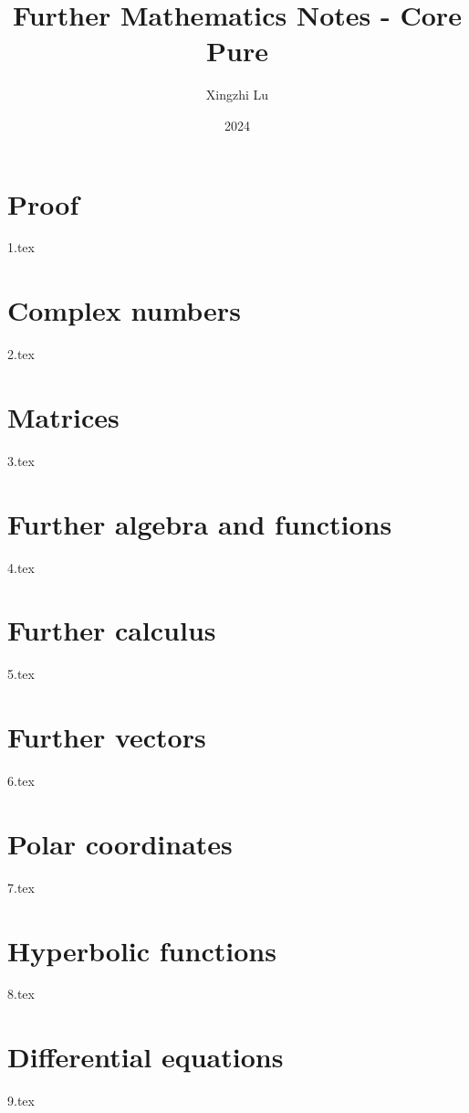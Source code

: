 \documentclass[A4paper]{article}
\title{Further Mathematics Notes - Core Pure}
\author{Xingzhi Lu}
\date{2024}
\begin{document}
	\maketitle
	\tableofcontents
	\pagebreak
	\section{Proof}
	{1.tex} \pagebreak
	\section{Complex numbers}
	{2.tex} \pagebreak
	\section{Matrices}
	{3.tex} \pagebreak
	\section{Further algebra and functions}
	{4.tex} \pagebreak
	\section{Further calculus}
	{5.tex} \pagebreak
	\section{Further vectors}
	{6.tex} \pagebreak
	\section{Polar coordinates}
	{7.tex} \pagebreak
	\section{Hyperbolic functions}
	{8.tex} \pagebreak
	\section{Differential equations}
	{9.tex} \pagebreak

	
	
	\pagebreak
	
	
\end{document}
